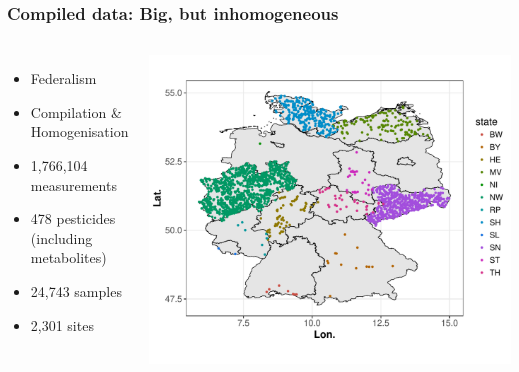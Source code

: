 \documentclass[
	10pt
	]{beamer}
\begin{document}
\begin{frame}
\frametitle{Compiled data: Big, but inhomogeneous}
	\begin{columns}[T]
	    	\begin{itemize}
	    		\item Federalism
	    		\item Compilation \& Homogenisation
	    		\vspace{1em}
	    		\item 1,766,104 measurements 
	    		\item 478 pesticides (including metabolites)
	    		\item 24,743 samples 
	    		\item 2,301 sites
	    	\end{itemize}
	    	\includegraphics[width = 1.1\textwidth]{figs/map_phch.pdf}
	 \end{columns}
\end{frame}
\end{document}
